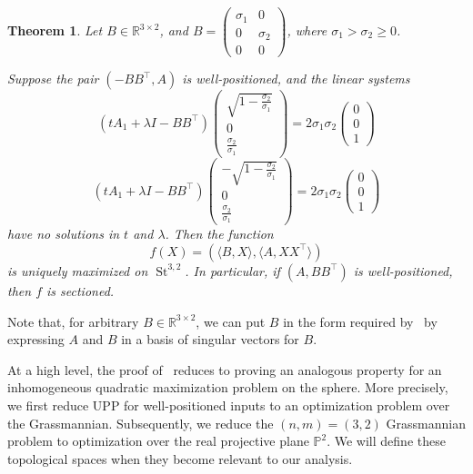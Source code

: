 \documentclass{article}
\numberwithin{equation}{section}
\newcommand{\R}{\mathbb{R}}
\newcommand{\PP}{\mathbb{P}}
\newtheorem{theorem}{Theorem}[section]
\DeclareMathOperator{\St}{St}
\begin{document}
\begin{theorem}
\label{thm:UPP32}
    Let $B \in \R^{3 \times 2}$, and 
    $B = \begin{pmatrix} \sigma_1 & 0\\ 0&\sigma_2\\0&0\end{pmatrix}$, where $\sigma_1 > \sigma_2 \ge 0$.
    
    Suppose the pair $(-BB^{\intercal}, A)$ is well-positioned, and the linear systems
    \[
        (t A_1 + \lambda I - BB^{\intercal})
        \begin{pmatrix}
        \sqrt{1-\frac{\sigma_2}{\sigma_1}} \\ 0 \\ \frac{\sigma_2}{\sigma_1}
        \end{pmatrix} = 2\sigma_1\sigma_2
        \begin{pmatrix}0\\0\\1\end{pmatrix}
    \]
    \[
        (t A_1 + \lambda I - BB^{\intercal})
        \begin{pmatrix}
        -\sqrt{1-\frac{\sigma_2}{\sigma_1}} \\ 0 \\ \frac{\sigma_2}{\sigma_1}
        \end{pmatrix} = 2\sigma_1\sigma_2
        \begin{pmatrix}0\\0\\1\end{pmatrix}
    \]
    have no solutions in $t$ and $\lambda$.
    Then the function 
    \[
    f(X) = (\langle B, X\rangle, \langle A, XX^{\intercal}\rangle)
    \]is uniquely maximized on $\St^{3,2}$. In particular, if $(A,BB^{\intercal})$ is well-positioned, then $f$ is sectioned.
\end{theorem}

Note that, for arbitrary $B \in \R^{3\times 2}$, we can put $B$ in the form required by~ by expressing $A$ and $B$ in a basis of singular vectors for $B$.

At a high level, the proof of~ reduces to proving an analogous property for an inhomogeneous quadratic maximization problem on the sphere. More precisely, we first reduce UPP for well-positioned inputs to an optimization problem over the Grassmannian.
Subsequently, we reduce the $(n,m) = (3,2)$ Grassmannian problem to optimization over the real projective plane $\PP^2.$ We will define these topological spaces when they become relevant to our analysis.
\end{document}
